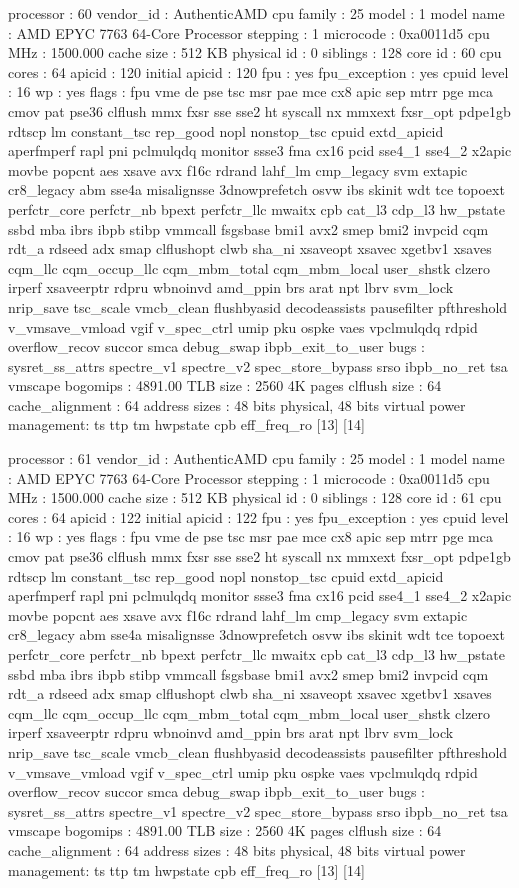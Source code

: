processor	: 60
vendor_id	: AuthenticAMD
cpu family	: 25
model		: 1
model name	: AMD EPYC 7763 64-Core Processor
stepping	: 1
microcode	: 0xa0011d5
cpu MHz		: 1500.000
cache size	: 512 KB
physical id	: 0
siblings	: 128
core id		: 60
cpu cores	: 64
apicid		: 120
initial apicid	: 120
fpu		: yes
fpu_exception	: yes
cpuid level	: 16
wp		: yes
flags		: fpu vme de pse tsc msr pae mce cx8 apic sep mtrr pge mca cmov pat pse36 clflush mmx fxsr sse sse2 ht syscall nx mmxext fxsr_opt pdpe1gb rdtscp lm constant_tsc rep_good nopl nonstop_tsc cpuid extd_apicid aperfmperf rapl pni pclmulqdq monitor ssse3 fma cx16 pcid sse4_1 sse4_2 x2apic movbe popcnt aes xsave avx f16c rdrand lahf_lm cmp_legacy svm extapic cr8_legacy abm sse4a misalignsse 3dnowprefetch osvw ibs skinit wdt tce topoext perfctr_core perfctr_nb bpext perfctr_llc mwaitx cpb cat_l3 cdp_l3 hw_pstate ssbd mba ibrs ibpb stibp vmmcall fsgsbase bmi1 avx2 smep bmi2 invpcid cqm rdt_a rdseed adx smap clflushopt clwb sha_ni xsaveopt xsavec xgetbv1 xsaves cqm_llc cqm_occup_llc cqm_mbm_total cqm_mbm_local user_shstk clzero irperf xsaveerptr rdpru wbnoinvd amd_ppin brs arat npt lbrv svm_lock nrip_save tsc_scale vmcb_clean flushbyasid decodeassists pausefilter pfthreshold v_vmsave_vmload vgif v_spec_ctrl umip pku ospke vaes vpclmulqdq rdpid overflow_recov succor smca debug_swap ibpb_exit_to_user
bugs		: sysret_ss_attrs spectre_v1 spectre_v2 spec_store_bypass srso ibpb_no_ret tsa vmscape
bogomips	: 4891.00
TLB size	: 2560 4K pages
clflush size	: 64
cache_alignment	: 64
address sizes	: 48 bits physical, 48 bits virtual
power management: ts ttp tm hwpstate cpb eff_freq_ro [13] [14]

processor	: 61
vendor_id	: AuthenticAMD
cpu family	: 25
model		: 1
model name	: AMD EPYC 7763 64-Core Processor
stepping	: 1
microcode	: 0xa0011d5
cpu MHz		: 1500.000
cache size	: 512 KB
physical id	: 0
siblings	: 128
core id		: 61
cpu cores	: 64
apicid		: 122
initial apicid	: 122
fpu		: yes
fpu_exception	: yes
cpuid level	: 16
wp		: yes
flags		: fpu vme de pse tsc msr pae mce cx8 apic sep mtrr pge mca cmov pat pse36 clflush mmx fxsr sse sse2 ht syscall nx mmxext fxsr_opt pdpe1gb rdtscp lm constant_tsc rep_good nopl nonstop_tsc cpuid extd_apicid aperfmperf rapl pni pclmulqdq monitor ssse3 fma cx16 pcid sse4_1 sse4_2 x2apic movbe popcnt aes xsave avx f16c rdrand lahf_lm cmp_legacy svm extapic cr8_legacy abm sse4a misalignsse 3dnowprefetch osvw ibs skinit wdt tce topoext perfctr_core perfctr_nb bpext perfctr_llc mwaitx cpb cat_l3 cdp_l3 hw_pstate ssbd mba ibrs ibpb stibp vmmcall fsgsbase bmi1 avx2 smep bmi2 invpcid cqm rdt_a rdseed adx smap clflushopt clwb sha_ni xsaveopt xsavec xgetbv1 xsaves cqm_llc cqm_occup_llc cqm_mbm_total cqm_mbm_local user_shstk clzero irperf xsaveerptr rdpru wbnoinvd amd_ppin brs arat npt lbrv svm_lock nrip_save tsc_scale vmcb_clean flushbyasid decodeassists pausefilter pfthreshold v_vmsave_vmload vgif v_spec_ctrl umip pku ospke vaes vpclmulqdq rdpid overflow_recov succor smca debug_swap ibpb_exit_to_user
bugs		: sysret_ss_attrs spectre_v1 spectre_v2 spec_store_bypass srso ibpb_no_ret tsa vmscape
bogomips	: 4891.00
TLB size	: 2560 4K pages
clflush size	: 64
cache_alignment	: 64
address sizes	: 48 bits physical, 48 bits virtual
power management: ts ttp tm hwpstate cpb eff_freq_ro [13] [14]

